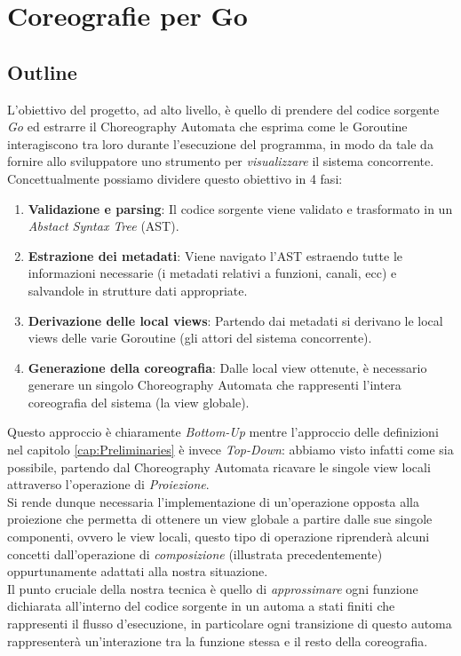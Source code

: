 \chapter{Coreografie per Go}
\section{Outline} \label{sec:GoOutline}
L'obiettivo del progetto, ad alto livello, è quello di prendere del codice sorgente \emph{Go} ed estrarre il Choreography Automata che esprima come le Goroutine interagiscono tra loro durante l'esecuzione del programma, in modo da tale da fornire allo sviluppatore uno strumento per \emph{visualizzare} il sistema concorrente.\\
Concettualmente possiamo dividere questo obiettivo in 4 fasi:
\begin{enumerate}
    \item \textbf{Validazione e parsing}: Il codice sorgente viene validato e trasformato in un \emph{Abstact Syntax Tree} (AST).
    \item \textbf{Estrazione dei metadati}: Viene navigato l'AST estraendo tutte le informazioni necessarie (i metadati relativi a funzioni, canali, ecc) e salvandole in strutture dati appropriate.
    \item \textbf{Derivazione delle local views}: Partendo dai metadati si derivano le local views delle varie Goroutine (gli attori del sistema concorrente).
    \item \textbf{Generazione della coreografia}: Dalle local view ottenute, è necessario generare un singolo Choreography Automata che rappresenti l'intera coreografia del sistema (la view globale).
\end{enumerate}
Questo approccio è chiaramente \emph{Bottom-Up} mentre l'approccio delle definizioni nel capitolo \ref{cap:Preliminaries} è invece \emph{Top-Down}: abbiamo visto infatti come sia possibile, partendo dal Choreography Automata ricavare le singole view locali attraverso l'operazione di \emph{Proiezione}.\\
Si rende dunque necessaria l'implementazione di un'operazione opposta alla proiezione che permetta di ottenere un view globale a partire dalle sue singole componenti, ovvero le view locali, questo tipo di operazione riprenderà alcuni concetti dall'operazione di \emph{composizione} (illustrata precedentemente) oppurtunamente adattati alla nostra situazione. \\
Il punto cruciale della nostra tecnica è quello di \emph{approssimare} ogni funzione dichiarata all'interno del codice sorgente in un automa a stati finiti che rappresenti il flusso d'esecuzione, in particolare ogni transizione di questo automa rappresenterà un'interazione tra la funzione stessa e il resto della coreografia. \bigskip \\
